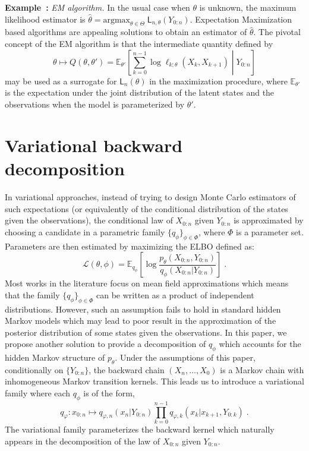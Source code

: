 \documentclass{article}
\newcommand{\1}{\mathbbm{1}}
\newcommand{\llh}[1]{\mathsf{L}_{#1}}
\newcommand{\parvec}{\theta}
\newcommand{\parspace}{\Theta}
\def\pE{\mathbb{E}}
\newcommand{\eqsp}{\;}
\newcommand{\qg}[1]{\ell_{#1}}
\newcounter{example}[section]
\newenvironment{example}[1][]{\refstepcounter{example}\par\medskip
   \noindent \textbf{Example~\theexample:} \textit{#1} \text \rmfamily}{\medskip}
\begin{document}
\begin{example}[EM algorithm.]
\label{ex:em:algorithm}
In the usual case when $\theta$ is unknown, the maximum likelihood estimator is $\widehat \parvec = \mathrm{argmax}_{\parvec\in\parspace}\eqsp\llh{n,\parvec}(Y_{0:n})$. Expectation Maximization based algorithms are appealing solutions to obtain an estimator of $\hat \parvec$.
The pivotal concept of the EM algorithm is that the intermediate quantity defined by
\begin{equation*}
\parvec\mapsto Q(\parvec,\parvec') = \pE_{\parvec'}\left[\sum_{k=0}^{n-1} \log \qg{k;\parvec}(X_{k}, X_{k+1})\middle | Y_{0:n}\right] 
\end{equation*}
may be used as a surrogate for $\llh{n}(\parvec)$ in the maximization procedure,  where $\pE_{\parvec'}$ is the expectation under the joint distribution of the latent states and the observations when the model is parameterized by $\parvec'$. 
\end{example}

\section{Variational backward decomposition}
In variational approaches, instead of trying to design Monte Carlo estimators of such expectations (or equivalently of the conditional distribution of the states given the observations), the conditional law of $X_{0:n}$ given $Y_{0:n}$ is approximated by choosing a candidate in a parametric family $\{q_\phi\}_{\phi \in \Phi}$, where $\Phi$ is a parameter set. Parameters are then estimated by maximizing the ELBO defined as:
$$
\mathcal{L}(\parvec,\phi) = \pE_{q_\phi}\left[\log \frac{p_\parvec(X_{0:n},Y_{0:n})}{q_\phi(X_{0:n}|Y_{0:n})}\right]\eqsp.
$$
Most works in the literature focus on mean field approximations which means that the family $\{q_\phi\}_{\phi \in \Phi}$ can be written as a product of independent distributions. However, such an assumption fails to hold in standard hidden Markov models which may lead to poor result in the approximation of the posterior distribution of some states given the observations. In this paper, we propose another solution to provide a decomposition of   $q_\phi$ which accounts for the hidden Markov structure of $p_\parvec$. Under the assumptions of this paper, conditionally on $\{Y_{0:n}\}$, the backward chain $(X_n,\ldots,X_0)$ is a Markov chain with inhomogeneous Markov transition kernels. This leads us to introduce a variational family where each $q_\phi$ is of the form,
$$
q_\varphi: x_{0:n} \mapsto q_{\varphi,n}(x_n|Y_{0:n})\prod_{k=0}^{n-1}q_{\varphi,k}(x_k|x_{k+1},Y_{0:k})\eqsp.
$$
The variational family parameterizes the backward kernel which naturally appears in the decomposition of the law of $X_{0:n}$ given $Y_{0:n}$. 
\end{document}
